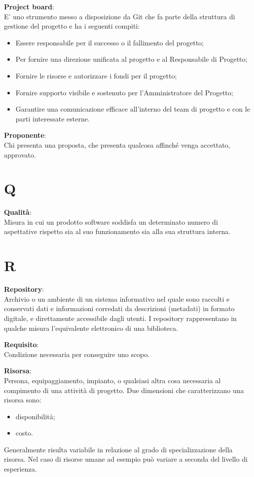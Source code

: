 \documentclass[a4paper, oneside, openany, dvipsnames, table]{article}
\begin{document}
\textbf{Project board}:\\	E' uno strumento messo a disposizione da Git che fa parte della struttura di gestione del progetto e ha i seguenti compiti:
\begin{itemize}
\item Essere responsabile per il successo o il fallimento del progetto;
\item Per fornire una direzione unificata al progetto e al Responsabile di Progetto;
\item Fornire le risorse e autorizzare i fondi per il progetto;
\item Fornire supporto visibile e sostenuto per l'Amministratore del Progetto;
\item Garantire una comunicazione efficace all'interno del team di progetto e con le parti interessate esterne.
\end{itemize}
\textbf{Proponente}:\\	Chi presenta una proposta, che presenta qualcosa affinché venga accettato, approvato.


\newpage
\section{Q}
\textbf{Qualità}:\\	Misura in cui un prodotto software soddisfa un determinato numero di aspettative rispetto sia al suo funzionamento sia alla sua struttura interna.


\newpage
\section{R}
\textbf{Repository}:\\	Archivio o un ambiente di un sistema informativo nel quale sono raccolti e conservati dati e informazioni corredati da descrizioni (metadati) in formato digitale, e direttamente accessibile dagli utenti. I repository rappresentano in qualche misura l’equivalente elettronico di una biblioteca.

\textbf{Requisito}:\\	Condizione necessaria per conseguire uno scopo.

\textbf{Risorsa}:\\	Persona, equipaggiamento, impianto, o qualsiasi altra cosa necessaria al compimento di una attività di progetto. Due dimensioni che caratterizzano una risorsa sono:
\begin{itemize}
\item disponibilità;
\item costo.
\end{itemize} 
Generalmente risulta variabile in relazione al grado di specializzazione della risorsa. Nel caso di risorse umane ad esempio può variare a seconda del livello di esperienza.
\end{document}
